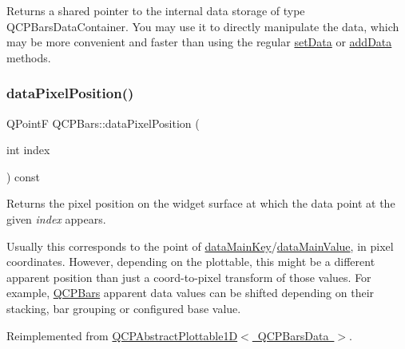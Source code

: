 Returns a shared pointer to the internal data storage of type Q\+C\+P\+Bars\+Data\+Container. You may use it to directly manipulate the data, which may be more convenient and faster than using the regular \mbox{\hyperlink{class_q_c_p_bars_a6dc562ec7120a8521e1061f2134367e4}{set\+Data}} or \mbox{\hyperlink{class_q_c_p_bars_a323d6970d6d6e3166d89916a7f60f733}{add\+Data}} methods. \mbox{\label{class_q_c_p_bars_a55cdaf565cd3384158d1f7f89533bc2d}} 
\subsubsection{\texorpdfstring{data\+Pixel\+Position()}{dataPixelPosition()}}
{\footnotesize\ttfamily Q\+PointF Q\+C\+P\+Bars\+::data\+Pixel\+Position (\begin{DoxyParamCaption}\item[{int}]{index }\end{DoxyParamCaption}) const\hspace{0.3cm}{\ttfamily [virtual]}}





Returns the pixel position on the widget surface at which the data point at the given {\itshape index} appears.

Usually this corresponds to the point of \mbox{\hyperlink{class_q_c_p_abstract_plottable1_d_ab14ab428595856bf76e04499017fa8dc}{data\+Main\+Key}}/\mbox{\hyperlink{class_q_c_p_abstract_plottable1_d_a0f913bb0889ca7cb574657a078fc8cff}{data\+Main\+Value}}, in pixel coordinates. However, depending on the plottable, this might be a different apparent position than just a coord-\/to-\/pixel transform of those values. For example, \mbox{\hyperlink{class_q_c_p_bars}{Q\+C\+P\+Bars}} apparent data values can be shifted depending on their stacking, bar grouping or configured base value. 

Reimplemented from \mbox{\hyperlink{class_q_c_p_abstract_plottable1_d_a14cf167457cda163575e6eec2a0b178d}{Q\+C\+P\+Abstract\+Plottable1\+D$<$ Q\+C\+P\+Bars\+Data $>$}}.

\mbox{\label{class_q_c_p_bars_ac5a3854774d9d9cd129b1eae1426de2d}} 
